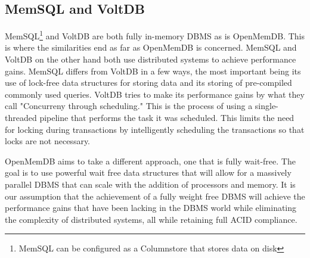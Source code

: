 \documentclass[letter,11pt]{article}
\begin{document}
\subsection{MemSQL and VoltDB}
MemSQL\footnote{MemSQL can be configured as a Columnstore that stores data on disk}
and VoltDB are both fully in-memory DBMS as is OpenMemDB. This is where the
similarities end as far as OpenMemDB is concerned. MemSQL and VoltDB on the other 
hand both use distributed systems to achieve performance gains. MemSQL differs from 
VoltDB in a few ways, the most important being its use of lock-free data structures
for storing data and its storing of pre-compiled commonly used queries\cite{MemSQL}.
VoltDB tries to make its performance gains by what they call "Concurreny through
scheduling."\cite{VoltDB} This is the process of using a single-threaded pipeline 
that performs the task it was scheduled. This limits the need for locking during
transactions by intelligently scheduling the transactions so that locks are not
necessary.
\par\vspace{\baselineskip}
OpenMemDB aims to take a different approach, one that is fully wait-free. The goal is 
to use powerful wait free data structures that will allow for a massively parallel 
DBMS that can scale with the addition of processors and memory. It is our assumption 
that the achievement of a fully weight free DBMS will achieve the performance gains 
that have been lacking in the DBMS world while eliminating the complexity of 
distributed systems, all while retaining full ACID compliance.

\newpage


\newpage
\end{document}
